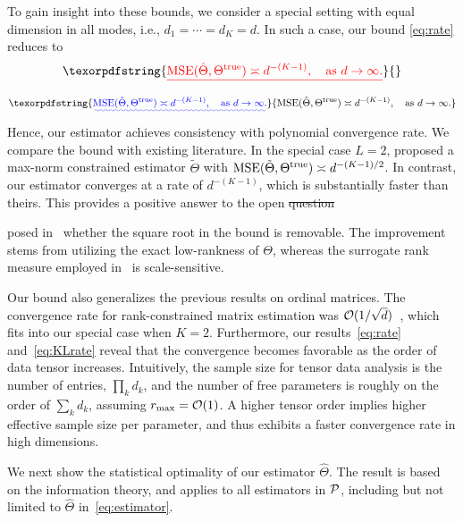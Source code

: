 \documentclass[11pt]{article}
\theoremstyle{plain}
\theoremstyle{definition}
\providecommand{\DIFaddtex}[1]{{\protect\color{blue}\uwave{#1}}} %
\providecommand{\DIFdeltex}[1]{{\protect\color{red}\sout{#1}}}                      %
\providecommand{\DIFaddbegin}{} %
\providecommand{\DIFaddend}{} %
\providecommand{\DIFdelbegin}{} %
\providecommand{\DIFdelend}{} %
\providecommand{\DIFadd}[1]{\texorpdfstring{\DIFaddtex{#1}}{#1}} %
\providecommand{\DIFdel}[1]{\texorpdfstring{\DIFdeltex{#1}}{}} %
\begin{document}
\DIFaddend To gain insight into these bounds, we consider a special setting with equal dimension in all modes, i.e., $d_1=\cdots=d_K=d$. In such a case, our bound \eqref{eq:rate} reduces to
\DIFdelbegin \begin{displaymath}\DIFdel{%
\text{MSE}(\hat \Theta, \trueT) \asymp d^{-(K-1)}, \quad \text{as}\ d\to \infty.
}\end{displaymath}
\DIFdelend \DIFaddbegin \begin{equation}\DIFadd{\label{eq:ours}
\mathrm{MSE}(\hat \Theta, \trueT) \asymp d^{-(K-1)}, \quad \text{as}\ d\to \infty.
}\end{equation}
\DIFaddend Hence, our estimator achieves consistency with polynomial convergence rate. We compare the bound with existing literature. In the special case $L=2$, \citet{ghadermarzy2018learning} proposed a max-norm constrained estimator $\tilde{\Theta}$ with $\text{MSE}(\tilde{\Theta}, \Theta^{\text{true}}) \asymp  d^{-(K-1)/2}$. In contrast, our estimator converges at a rate of $d^{-(K-1)}$, which is substantially faster than theirs. This provides a positive answer to the open \DIFdelbegin \DIFdel{question }\DIFdelend \DIFaddbegin \newtheorem{question}{Question} \DIFaddend posed in~\citet{ghadermarzy2018learning} whether the square root in the bound is removable. The improvement stems from utilizing the exact low-rankness of $\Theta$, whereas the surrogate rank measure employed in~\citet{ghadermarzy2018learning} is scale-sensitive.

Our bound also generalizes the previous results on ordinal matrices. The convergence rate for rank-constrained matrix estimation was $\mathcal{O}(1/\sqrt{d})$~\citep{bhaskar2016probabilistic}, which fits into our special case when $K=2$. Furthermore, our results~\eqref{eq:rate} and~\eqref{eq:KLrate} reveal that the convergence becomes favorable as the order of data tensor increases. Intuitively, the sample size for tensor data analysis is the number of entries, $\prod_k d_k$, and the number of free parameters is roughly on the order of $\sum_{k}d_k$, assuming $r_{\max}=\mathcal{O}(1)$. A higher tensor order implies higher effective sample size per parameter, and thus exhibits a faster convergence rate in high dimensions.


We next show the statistical optimality of our estimator $\hat \Theta$. The result is based on the information theory, and applies to all estimators in $\mathcal{P}$, including but not limited to $\hat \Theta$ in~\eqref{eq:estimator}.
\end{document}
